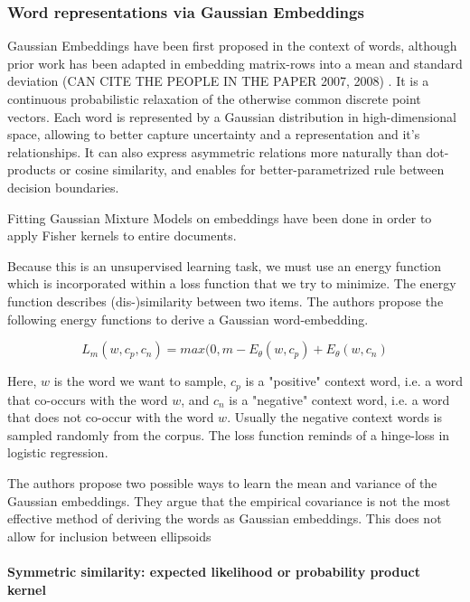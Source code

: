 \documentclass[a4paper,12pt,twoside,openright]{report}
\begin{document}
\subsubsection{Word representations via Gaussian Embeddings}

Gaussian Embeddings have been first proposed in the context of words, although prior work has been adapted in embedding matrix-rows into a mean and standard deviation (CAN CITE THE PEOPLE IN THE PAPER 2007, 2008) .
It is a continuous probabilistic relaxation of the otherwise common discrete point vectors.
Each word is represented by a Gaussian distribution in high-dimensional space, allowing to better capture uncertainty and a representation and it's relationships.
It can also express asymmetric relations more naturally than dot-products or cosine similarity, and enables for better-parametrized rule between decision boundaries.

Fitting Gaussian Mixture Models on embeddings have been done in order to apply Fisher kernels to entire documents.

Because this is an unsupervised learning task, we must use an energy function which is incorporated within a loss function that we try to minimize. 
The energy function describes (dis-)similarity between two items.
The authors propose the following energy functions to derive a Gaussian word-embedding.

\begin{equation}
L_m(w, c_p, c_n) = max(0, m - E_\theta(w, c_p) + E_\theta(w, c_n)
\end{equation}

Here, $w$ is the word we want to sample, $c_p$ is a "positive" context word, i.e. a word that co-occurs with the word $w$, and $c_n$ is a "negative" context word, i.e. a word that does not co-occur with the word $w$.
Usually the negative context words is sampled randomly from the corpus.
The loss function reminds of a hinge-loss in logistic regression.

The authors propose two possible ways to learn the mean and variance of the Gaussian embeddings.
They argue that the empirical covariance is not the most effective method of deriving the words as Gaussian embeddings.
This does not allow for inclusion between ellipsoids 

\paragraph{Symmetric similarity: expected likelihood or probability product kernel}
\end{document}
